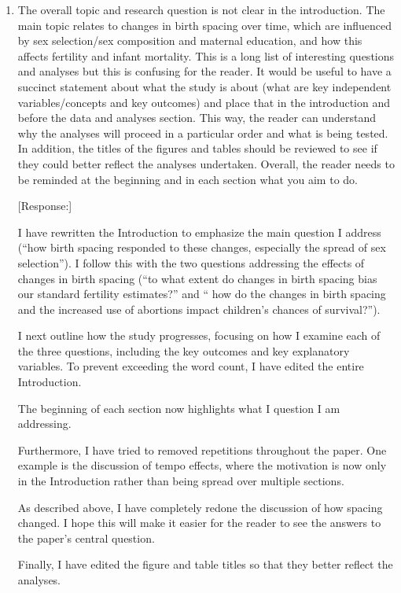 \documentclass[letterpaper,12pt]{article}
\begin{document}
\begin{enumerate}

\item The overall topic and research question is not clear in the
introduction. The main topic relates to changes in birth spacing over
time, which are influenced by sex selection/sex composition and maternal
education, and how this affects fertility and infant mortality. This is
a long list of interesting questions and analyses but this is confusing
for the reader. It would be useful to have a succinct statement about
what the study is about (what are key independent variables/concepts and
key outcomes) and place that in the introduction and before the data and
analyses section. This way, the reader can understand why the analyses
will proceed in a particular order and what is being tested. In
addition, the titles of the figures and tables should be reviewed to see
if they could better reflect the analyses undertaken. Overall, the
reader needs to be reminded at the beginning and in each section what
you aim to do.

[Response:] 

I have rewritten the Introduction to emphasize the main question I address (``how birth 
spacing responded to these changes, especially the spread of sex selection'').
I follow this with the two questions addressing the effects of changes in 
birth spacing (``to what extent do changes in birth spacing bias our standard fertility 
estimates?'' and `` how do the changes in birth spacing and the increased use of abortions 
impact children's chances of survival?'').

I next outline how the study progresses, focusing on how I examine each of the three 
questions, including the key outcomes and key explanatory variables. 
To prevent exceeding the word count, I have edited the entire Introduction. 

The beginning of each section now highlights what I question I am addressing.

Furthermore, I have tried to removed repetitions throughout the paper. 
One example is the discussion of tempo effects, where the motivation is now 
only in the Introduction rather than being spread over multiple sections.

As described above, I have completely redone the discussion of how spacing changed.
I hope this will make it easier for the reader to see the answers to the paper's central 
question.

Finally, I have edited the figure and table titles so that they better reflect the analyses.




\end{enumerate}
\end{document}

